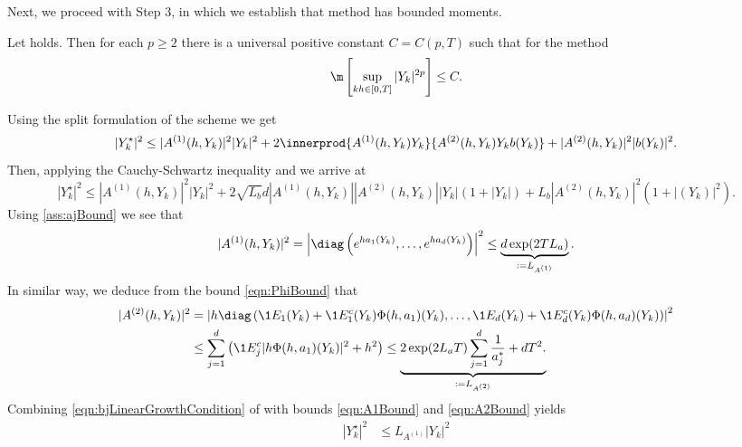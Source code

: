	Next, we proceed with Step 3, in which we establish that \SM method has bounded moments.
\begin{lem}\label{lem:SSSMMomentBounds}
	Let  holds. Then for each $p\geq 2$ there is 
	a universal positive constant 
	$C=C(p,T)$ 
	such that for the \SM method
	\begin{equation*}
		\m\left[
		\sup_{kh \in [0,T]}
		|Y_k|^{2p}
		\right]\leq C.
	\end{equation*}
\end{lem}
\begin{pf}
	Using the split formulation of the \SM scheme  we get
	\begin{dmath}[label=leqn:Yn2Bound]
		|Y_k^{\star}|^{2}
		\leq
			|A^{(1)}(h,Y_k)|^2 |Y_k|^2  
			+ 2 \innerprod{A^{(1)}(h,Y_k)Y_k}{A^{(2)}(h,Y_k) Y_k b(Y_k)}
			+|A^{(2)}(h,Y_k)|^2 |b(Y_k)|^2.
	\end{dmath}
	Then, applying the Cauchy-Schwartz inequality and  we arrive at
	\begin{dmath*}[label=leqn:Yn2Bound]
		|Y_k^{\star}|^{2}
		\leq
		|A^{(1)}(h,Y_k)|^2 |Y_k|^2  
		+ 2 \sqrt{L_b} d|A^{(1)}(h,Y_k)||A^{(2)}(h,Y_k)||Y_k|(1+|Y_k|)
		+L_b|A^{(2)}(h,Y_k)|^2 (1+|(Y_k)|^2).
	\end{dmath*}
	Using \eqref{ass:ajBound} we see that
	\begin{dmath}[label=eqn:A1Bound]
		|A^{(1)}(h,Y_k)|^2 
		=
			\left|
				\diag
				\left(
					e^{ha_1(Y_k)}, \dots, e^{ha_d(Y_k)} 
				\right)
			\right|^2
		\leq
		 \underbrace{d \exp( 2 T L_a)}_{:= L_{A^{(1)}}}.		
	\end{dmath}
	In similar way, we deduce from the bound \eqref{eqn:PhiBound} that
	\begin{align}
		|A^{(2)}(h,Y_k)|^2 
		&=
		\left|
			h 
			\diag
			\left(
				\1{E_1}(Y_k)
				+\1{E_1^c}(Y_k)\Phi(h,a_1)(Y_k), 
				\dots,
				\1{E_d}(Y_k)
				+\1{E_d^c}(Y_k) \Phi(h,a_d)(Y_k)
			\right)
		\right|^2 \notag \\
		&\leq
		\sum_{j=1}^{d}
		\left(
			\1{E_j^c}
			|h\Phi(h,a_1)(Y_k)|^2
			+ h^2
		\right)
		\leq
		\underbrace{
			2\exp(2 L_a  T)
				\sum_{j=1}^d
				\frac{1}{a_j^*} + d T^2.			
		}_{:=L_{A^{(2)}}}
		\label{eqn:A2Bound}
	\end{align}
	Combining \eqref{eqn:bjLinearGrowthCondition} of  with bounds \eqref{eqn:A1Bound}
	and \eqref{eqn:A2Bound} yields
	\begin{align*}
		|Y_k^{\star}|^2
		&\leq
			L_{A^{(1)}} |Y_k|^2

\end{align*}
\end{pf}
